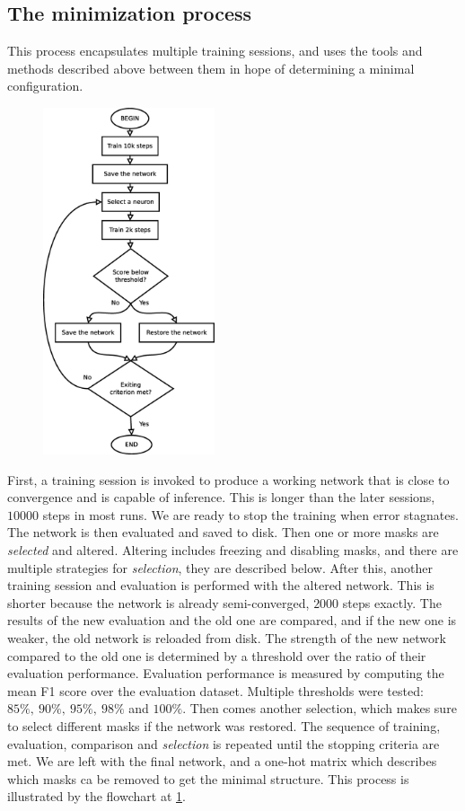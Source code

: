 \documentclass[12pt]{report}
\begin{document}
\subsection{The minimization process}
This process encapsulates multiple training sessions, and uses the tools and methods described above between them in hope of determining a minimal configuration.

\begin{figure}
	\includegraphics[width=0.45\textwidth]{dia/flow.eps}
	\caption{ }
	\label{flow}
\end{figure}
First, a training session is invoked to produce a working network that is close to convergence and is capable of inference. This is longer than the later sessions, $10000$ steps in most runs. We are ready to stop the training when error stagnates. The network is then evaluated and saved to disk. Then one or more masks are \textit{selected} and altered. Altering includes freezing and disabling masks, and there are multiple strategies for \textit{selection}, they are described below. After this, another training session and evaluation is performed with the altered network. This is shorter because the network is already semi-converged, $2000$ steps exactly. The results of the new evaluation and the old one are compared, and if the new one is weaker, the old network is reloaded from disk. The strength of the new network compared to the old one is determined by a threshold over the ratio of their evaluation performance. Evaluation performance is measured by computing the mean F1 score over the evaluation dataset. Multiple thresholds were tested: $ 85\%,\ 90\%,\ 95\%,\ 98\%$ and $100\%$. Then comes another selection, which makes sure to select different masks if the network was restored. The sequence of training, evaluation, comparison and \textit{selection} is repeated until the stopping criteria are met. We are left with the final network, and a one-hot matrix which describes which masks ca be removed to get the minimal structure. This process is illustrated by the flowchart at \ref{flow}.
\end{document}
